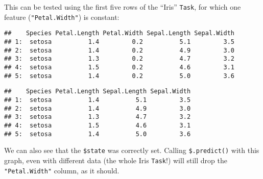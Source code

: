 \documentclass[
]{scrbook}
\newenvironment{Shaded}{\begin{snugshade}}{\end{snugshade}}
\newcommand{\DecValTok}[1]{\textcolor[rgb]{0.00,0.00,0.81}{#1}}
\newcommand{\FunctionTok}[1]{\textcolor[rgb]{0.00,0.00,0.00}{#1}}
\newcommand{\NormalTok}[1]{#1}
\newcommand{\OtherTok}[1]{\textcolor[rgb]{0.56,0.35,0.01}{#1}}
\newcommand{\SpecialCharTok}[1]{\textcolor[rgb]{0.00,0.00,0.00}{#1}}
\renewenvironment{Shaded} {\begin{snugshade}\small} {\end{snugshade}}
\begin{document}
This can be tested using the first five rows of the ``Iris'' \texttt{Task}, for which one feature (\texttt{"Petal.Width"}) is constant:

\begin{Shaded}
\end{Shaded}

\begin{verbatim}
##    Species Petal.Length Petal.Width Sepal.Length Sepal.Width
## 1:  setosa          1.4         0.2          5.1         3.5
## 2:  setosa          1.4         0.2          4.9         3.0
## 3:  setosa          1.3         0.2          4.7         3.2
## 4:  setosa          1.5         0.2          4.6         3.1
## 5:  setosa          1.4         0.2          5.0         3.6
\end{verbatim}

\begin{Shaded}
\end{Shaded}

\begin{verbatim}
##    Species Petal.Length Sepal.Length Sepal.Width
## 1:  setosa          1.4          5.1         3.5
## 2:  setosa          1.4          4.9         3.0
## 3:  setosa          1.3          4.7         3.2
## 4:  setosa          1.5          4.6         3.1
## 5:  setosa          1.4          5.0         3.6
\end{verbatim}

We can also see that the \texttt{\$state} was correctly set.
Calling \texttt{\$.predict()} with this graph, even with different data (the whole Iris \texttt{Task}!) will still drop the \texttt{"Petal.Width"} column, as it should.
\end{document}

